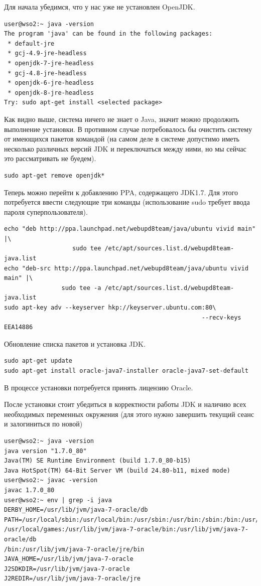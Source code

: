 \documentclass[a4paper, 12pt]{article}		%
\begin{document}
Для начала убедимся, что у нас уже не установлен OpenJDK.

\begin{Verbatim}[frame=single]
user@wso2:~ java -version
The program 'java' can be found in the following packages:
 * default-jre
 * gcj-4.9-jre-headless
 * openjdk-7-jre-headless
 * gcj-4.8-jre-headless
 * openjdk-6-jre-headless
 * openjdk-8-jre-headless
Try: sudo apt-get install <selected package>
\end{Verbatim}

Как видно выше, система ничего не знает о Java, значит можно продолжить выполнение установки. В противном случае потребовалось бы очистить систему от имеющихся пакетов командой (на самом деле в системе допустимо иметь несколько различных версий JDK и переключаться между ними, но мы сейчас это рассматривать не буедем).
\begin{Verbatim}[frame=single]
sudo apt-get remove openjdk*
\end{Verbatim}

Теперь можно перейти к добавлению PPA, содержащего JDK1.7. Для этого потребуется ввести следующие три команды (использование sudo требует ввода пароля суперпользователя).
\begin{Verbatim}[frame=single]
echo "deb http://ppa.launchpad.net/webupd8team/java/ubuntu vivid main" |\
                   sudo tee /etc/apt/sources.list.d/webupd8team-java.list
echo "deb-src http://ppa.launchpad.net/webupd8team/java/ubuntu vivid main" |\
                sudo tee -a /etc/apt/sources.list.d/webupd8team-java.list
sudo apt-key adv --keyserver hkp://keyserver.ubuntu.com:80\
                                                       --recv-keys EEA14886
\end{Verbatim}

Обновление списка пакетов и установка JDK.

\begin{Verbatim}[frame=single]
sudo apt-get update
sudo apt-get install oracle-java7-installer oracle-java7-set-default
\end{Verbatim}

В процессе установки потребуется принять лицензию Oracle.

После установки стоит убедиться в корректности работы JDK и наличию всех необходимых переменных окружения (для этого нужно завершить текущий сеанс и залогиниться по новой)

\begin{Verbatim}[frame=single]
user@wso2:~ java -version
java version "1.7.0_80"
Java(TM) SE Runtime Environment (build 1.7.0_80-b15)
Java HotSpot(TM) 64-Bit Server VM (build 24.80-b11, mixed mode)
user@wso2:~ javac -version
javac 1.7.0_80
user@wso2:~ env | grep -i java
DERBY_HOME=/usr/lib/jvm/java-7-oracle/db
PATH=/usr/local/sbin:/usr/local/bin:/usr/sbin:/usr/bin:/sbin:/bin:/usr/games:
/usr/local/games:/usr/lib/jvm/java-7-oracle/bin:/usr/lib/jvm/java-7-oracle/db
/bin:/usr/lib/jvm/java-7-oracle/jre/bin
JAVA_HOME=/usr/lib/jvm/java-7-oracle
J2SDKDIR=/usr/lib/jvm/java-7-oracle
J2REDIR=/usr/lib/jvm/java-7-oracle/jre
\end{Verbatim}
\end{document}
